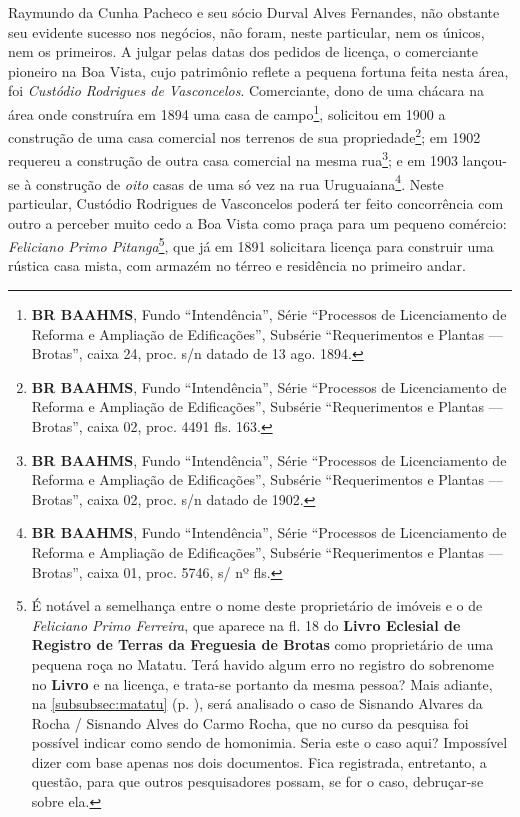 Raymundo da Cunha Pacheco e seu sócio Durval Alves Fernandes, não obstante seu evidente sucesso nos negócios, não foram, neste particular, nem os únicos, nem os primeiros. A julgar pelas datas dos pedidos de licença, o comerciante pioneiro na Boa Vista, cujo patrimônio reflete a pequena fortuna feita nesta área, foi \textit{Custódio Rodrigues de Vasconcelos}. Comerciante, dono de uma chácara na área onde construíra em 1894 uma casa de campo\footnote{\textbf{BR BAAHMS}, Fundo ``Intendência'', Série ``Processos de Licenciamento de Reforma e Ampliação de Edificações'', Subsérie ``Requerimentos e Plantas --- Brotas'', caixa 24, proc. s/n datado de 13 ago. 1894.}, solicitou em 1900 a construção de uma casa comercial nos terrenos de sua propriedade\footnote{\textbf{BR BAAHMS}, Fundo ``Intendência'', Série ``Processos de Licenciamento de Reforma e Ampliação de Edificações'', Subsérie ``Requerimentos e Plantas --- Brotas'', caixa 02, proc. 4491 fls. 163.}; em 1902 requereu a construção de outra casa comercial na mesma rua\footnote{\textbf{BR BAAHMS}, Fundo ``Intendência'', Série ``Processos de Licenciamento de Reforma e Ampliação de Edificações'', Subsérie ``Requerimentos e Plantas --- Brotas'', caixa 02, proc. s/n datado de 1902.}; e em 1903 lançou-se à construção de \textit{oito} casas de uma só vez na rua Uruguaiana\footnote{\textbf{BR BAAHMS}, Fundo ``Intendência'', Série ``Processos de Licenciamento de Reforma e Ampliação de Edificações'', Subsérie ``Requerimentos e Plantas --- Brotas'', caixa 01, proc. 5746, s/ nº fls.}. Neste particular, Custódio Rodrigues de Vasconcelos poderá ter feito concorrência com outro a perceber muito cedo a Boa Vista como praça para um pequeno comércio: \textit{Feliciano Primo Pitanga}\footnote{É notável a semelhança entre o nome deste proprietário de imóveis e o de \textit{Feliciano Primo Ferreira}, que aparece na fl. 18 do \textbf{Livro Eclesial de Registro de Terras da Freguesia de Brotas} como proprietário de uma pequena roça no Matatu. Terá havido algum erro no registro do sobrenome no \textbf{Livro} e na licença, e trata-se portanto da mesma pessoa? Mais adiante, na \autoref{subsubsec:matatu} (p. \pageref{subsubsec:matatu}), será analisado o caso de Sisnando Alvares da Rocha / Sisnando Alves do Carmo Rocha, que no curso da pesquisa foi possível indicar como sendo de homonimia. Seria este o caso aqui? Impossível dizer com base apenas nos dois documentos. Fica registrada, entretanto, a questão, para que outros pesquisadores possam, se for o caso, debruçar-se sobre ela.}, que já em 1891 solicitara licença para construir uma rústica casa mista, com armazém no térreo e residência no primeiro andar.

